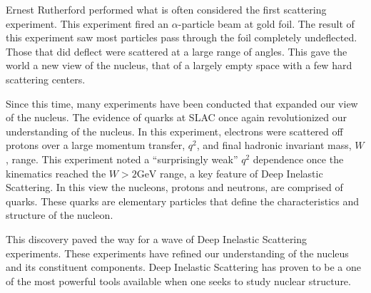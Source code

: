 
Ernest Rutherford performed what is often considered the first scattering experiment. This experiment fired an $\alpha$-particle beam at gold foil. The result of this experiment saw most particles pass through the foil completely undeflected. Those that did deflect were scattered at a large range of angles. This gave the world a new view of the nucleus, that of a largely empty space with a few hard scattering centers.\cite{GRIF}

Since this time, many experiments have been conducted that expanded our view of the nucleus. The evidence of quarks at SLAC once again revolutionized our understanding of the nucleus. In this experiment, electrons were scattered off protons over a large momentum transfer, $q^2$, and final hadronic invariant mass, $W$, range. This experiment noted a ``surprisingly weak'' $q^2$ dependence once the kinematics reached the $W>2 \textrm{GeV}$ range, a key feature of Deep Inelastic Scattering.\cite{SLAC_DIS} In this view the nucleons, protons and neutrons, are comprised of quarks. These quarks are elementary particles that define the characteristics and structure of the nucleon.\cite{DoQ}

This discovery paved the way for a wave of Deep Inelastic Scattering experiments. These experiments have refined our understanding of the nucleus and its constituent components. Deep Inelastic Scattering has proven to be a one of the most powerful tools available when one seeks to study nuclear structure.

